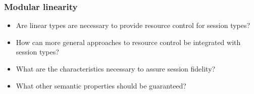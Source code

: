 \begin{frame}\frametitle{Modular linearity}


  \begin{itemize}
    \item Are linear types are necessary to provide resource control for session types?
    \item How can more general approaches to resource control be integrated with session types?
    \item What are the characteristics necessary to assure session fidelity?
    \item What other semantic properties should be guaranteed?
  \end{itemize}


\end{frame}

